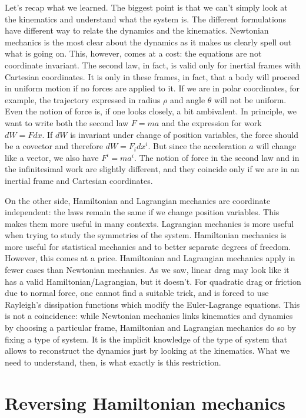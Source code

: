 Let's recap what we learned. The biggest point is that we can't simply look at the kinematics and understand what the system is. The different formulations have different way to relate the dynamics and the kinematics. Newtonian mechanics is the most clear about the dynamics as it makes us clearly spell out what is going on. This, however, comes at a cost: the equations are not coordinate invariant. The second law, in fact, is valid only for inertial frames with Cartesian coordinates. It is only in these frames, in fact, that a body will proceed in uniform motion if no forces are applied to it. If we are in polar coordinates, for example, the trajectory expressed in radius $\rho$ and angle $\theta$ will not be uniform. Even the notion of force is, if one looks closely, a bit ambivalent. In principle, we want to write both the second law $F=ma$ and the expression for work $dW = F dx$. If $dW$ is invariant under change of position variables, the force should be a covector and therefore $dW = F_i dx^i$. But since the acceleration $a$ will change like a vector, we also have $F^i = m a^i$. The notion of force in the second law and in the infinitesimal work are slightly different, and they coincide only if we are in an inertial frame and Cartesian coordinates.

On the other side, Hamiltonian and Lagrangian mechanics are coordinate independent: the laws remain the same if we change position variables. This makes them more useful in many contexts. Lagrangian mechanics is more useful when trying to study the symmetries of the system. Hamiltonian mechanics is more useful for statistical mechanics and to better separate degrees of freedom. However, this comes at a price. Hamiltonian and Lagrangian mechanics apply in fewer cases than Newtonian mechanics. As we saw, linear drag may look like it has a valid Hamiltonian/Lagrangian, but it doesn't. For quadratic drag or friction due to normal force, one cannot find a suitable trick, and is forced to use Rayleigh’s dissipation functions which modify the Euler-Lagrange equations. This is not a coincidence: while Newtonian mechanics links kinematics and dynamics by choosing a particular frame, Hamiltonian and Lagrangian mechanics do so by fixing a type of system. It is the implicit knowledge of the type of system that allows to reconstruct the dynamics just by looking at the kinematics. What we need to understand, then, is what exactly is this restriction.

\section{Reversing Hamiltonian mechanics}

